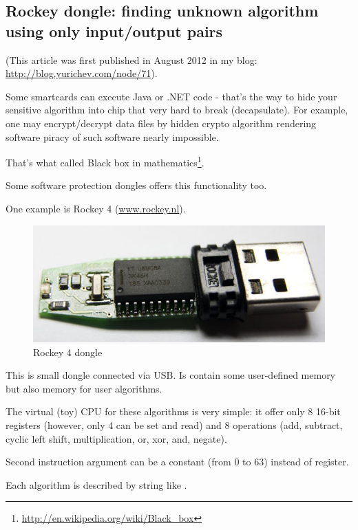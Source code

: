 ﻿\subsection{Rockey dongle: finding unknown algorithm using only input/output pairs}

(This article was first published in August 2012 in my blog: \url{http://blog.yurichev.com/node/71}).

Some smartcards can execute Java or .NET code - that's the way to hide your sensitive algorithm into chip that very hard to break (decapsulate).
For example, one may encrypt/decrypt data files by hidden crypto algorithm rendering software piracy of such software nearly impossible.

That's what called Black box in mathematics\footnote{\url{http://en.wikipedia.org/wiki/Black\_box}}.

Some software protection dongles offers this functionality too.

One example is Rockey 4 (\href{http://www.rockey.nl/en/rockey.html}{www.rockey.nl}).

\begin{figure}[H]
\centering
\includegraphics[scale=2]{SMT/rockey_4.jpg}
\caption{Rockey 4 dongle}
\end{figure}

This is small dongle connected via USB. Is contain some user-defined memory but also memory for user algorithms.

The virtual (toy) CPU for these algorithms is very simple: it offer only 8 16-bit registers (however, only 4 can be set and read) and 8 operations (add, subtract, cyclic left shift, multiplication, or, xor, and, negate).

Second instruction argument can be a constant (from 0 to 63) instead of register.

Each algorithm is described by string like \colorbox{light-gray}{}.

